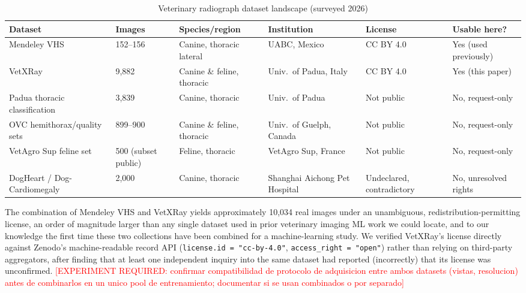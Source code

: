 \documentclass[journal]{IEEEtran}
\newcommand{\pending}[1]{\textcolor{red}{[EXPERIMENT REQUIRED: #1]}}
\begin{document}
\begin{table}[t]
\centering
\caption{Veterinary radiograph dataset landscape (surveyed 2026)}
\label{tab:landscape}
\begin{tabularx}{\textwidth}{@{}p{2.3cm}p{1.4cm}p{2.6cm}p{2.6cm}p{2.0cm}X@{}}
\toprule
Dataset & Images & Species/region & Institution & License & Usable here? \\
\midrule
Mendeley VHS \cite{mendeley_vhs_dataset,dib_companion_2021} & 152--156 & Canine, thoracic lateral & UABC, Mexico & CC BY 4.0 & Yes (used previously) \\
VetXRay \cite{vetxray_2026} & 9{,}882 & Canine \& feline, thoracic & Univ.\ of Padua, Italy & CC BY 4.0 & Yes (this paper) \\
Padua thoracic classification & 3{,}839 & Canine, thoracic & Univ.\ of Padua & Not public & No, request-only \\
OVC hemithorax/quality sets & 899--900 & Canine \& feline, thoracic & Univ.\ of Guelph, Canada & Not public & No, request-only \\
VetAgro Sup feline set & 500 (subset public) & Feline, thoracic & VetAgro Sup, France & Not public & No, request-only \\
DogHeart / Dog-Cardiomegaly & 2{,}000 & Canine, thoracic & Shanghai Aichong Pet Hospital & Undeclared, contradictory & No, unresolved rights \\
\bottomrule
\end{tabularx}
\end{table}

The combination of Mendeley VHS and VetXRay yields approximately 10{,}034 real images under an unambiguous, redistribution-permitting license, an order of magnitude larger than any single dataset used in prior veterinary imaging ML work we could locate, and to our knowledge the first time these two collections have been combined for a machine-learning study. We verified VetXRay's license directly against Zenodo's machine-readable record API (\texttt{license.id = "cc-by-4.0"}, \texttt{access\_right = "open"}) rather than relying on third-party aggregators, after finding that at least one independent inquiry into the same dataset had reported (incorrectly) that its license was unconfirmed. \pending{confirmar compatibilidad de protocolo de adquisicion entre ambos datasets (vistas, resolucion) antes de combinarlos en un unico pool de entrenamiento; documentar si se usan combinados o por separado}

\end{document}
